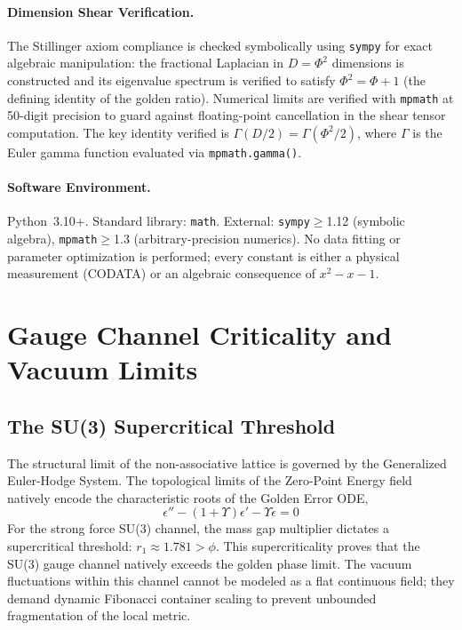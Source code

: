 \paragraph{Dimension Shear Verification.}
The Stillinger axiom compliance is checked symbolically using \texttt{sympy} for exact algebraic manipulation: the fractional Laplacian in $D = \Phi^2$ dimensions is constructed and its eigenvalue spectrum is verified to satisfy $\Phi^2 = \Phi + 1$ (the defining identity of the golden ratio). Numerical limits are verified with \texttt{mpmath} at 50-digit precision to guard against floating-point cancellation in the shear tensor computation. The key identity verified is $\Gamma(D/2) = \Gamma(\Phi^2/2)$, where $\Gamma$ is the Euler gamma function evaluated via \texttt{mpmath.gamma()}.

\paragraph{Software Environment.}
Python~3.10+. Standard library: \texttt{math}. External: \texttt{sympy}$\geq$1.12 (symbolic algebra), \texttt{mpmath}$\geq$1.3 (arbitrary-precision numerics). No data fitting or parameter optimization is performed; every constant is either a physical measurement (CODATA) or an algebraic consequence of $x^2 - x - 1$.

\section{Gauge Channel Criticality and Vacuum Limits}

\subsection{The SU(3) Supercritical Threshold}
The structural limit of the non-associative lattice is governed by the Generalized Euler-Hodge System. The topological limits of the Zero-Point Energy field natively encode the characteristic roots of the Golden Error ODE, 
\begin{equation}
    \epsilon'' - (1+\Upsilon)\epsilon' - \Upsilon\epsilon = 0
\end{equation}
For the strong force SU(3) channel, the mass gap multiplier dictates a supercritical threshold: $r_1 \approx 1.781 > \phi$. This supercriticality proves that the SU(3) gauge channel natively exceeds the golden phase limit. The vacuum fluctuations within this channel cannot be modeled as a flat continuous field; they demand dynamic Fibonacci container scaling to prevent unbounded fragmentation of the local metric.

